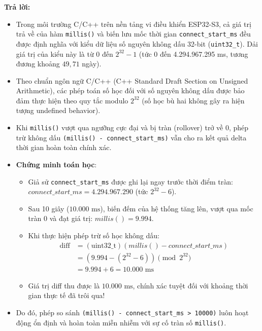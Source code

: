 \begin{tcolorbox}[colback=blue!3,colframe=blue!75!black,title=\textbf{Câu hỏi 5: Vì sao millis() - connect\_start\_ms > 10000 vẫn đúng khi millis() bị tràn sau khoảng 49 ngày?}]
\textbf{Trả lời:}
\begin{itemize}[leftmargin=*]
    \item Trong môi trường C/C++ trên nền tảng vi điều khiển ESP32-S3, cả giá trị trả về của hàm \texttt{millis()} và biến lưu mốc thời gian \texttt{connect\_start\_ms} đều được định nghĩa với kiểu dữ liệu số nguyên không dấu 32-bit (\texttt{uint32\_t}). Dải giá trị của kiểu này là từ 0 đến $2^{32} - 1$ (tức 0 đến 4.294.967.295 ms, tương đương khoảng $49,71$ ngày).
    \item Theo chuẩn ngôn ngữ C/C++ (C++ Standard Draft Section on Unsigned Arithmetic), các phép toán số học đối với số nguyên không dấu được bảo đảm thực hiện theo quy tắc modulo $2^{32}$ (số học bù hai không gây ra hiện tượng undefined behavior).
    \item Khi \texttt{millis()} vượt qua ngưỡng cực đại và bị tràn (rollover) trở về 0, phép trừ không dấu \texttt{(millis() - connect\_start\_ms)} vẫn cho ra kết quả delta thời gian hoàn toàn chính xác.
    \item \textbf{Chứng minh toán học}:
    \begin{itemize}
        \item Giả sử \texttt{connect\_start\_ms} được ghi lại ngay trước thời điểm tràn: $connect\_start\_ms = 4.294.967.290$ (tức $2^{32} - 6$).
        \item Sau 10 giây ($10.000\text{ ms}$), biến đếm của hệ thống tăng lên, vượt qua mốc tràn 0 và đạt giá trị: $millis() = 9.994$.
        \item Khi thực hiện phép trừ số học không dấu:
        \begin{align*}
        \text{diff} &= (\text{uint32\_t})(millis() - connect\_start\_ms) \\
                    &= (9.994 - (2^{32} - 6)) \pmod{2^{32}} \\
                    &= 9.994 + 6 = 10.000\text{ ms}
        \end{align*}
        \item Giá trị diff thu được là $10.000\text{ ms}$, chính xác tuyệt đối với khoảng thời gian thực tế đã trôi qua!
    \end{itemize}
    \item Do đó, phép so sánh \texttt{(millis() - connect\_start\_ms > 10000)} luôn hoạt động ổn định và hoàn toàn miễn nhiễm với sự cố tràn số \texttt{millis()}.
\end{itemize}
\end{tcolorbox}

